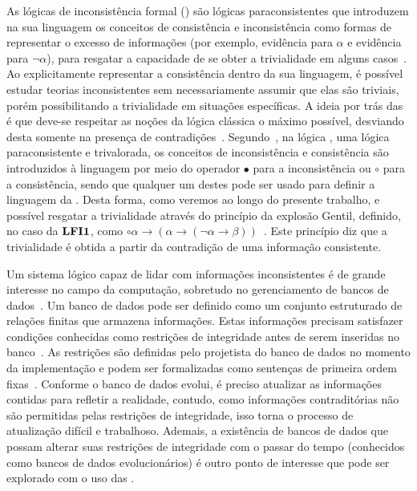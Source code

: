 As lógicas de inconsistência formal (\lfis{}) são lógicas paraconsistentes que introduzem na sua linguagem os conceitos de consistência e inconsistência como formas de representar o excesso de informações (por exemplo, evidência para $\alpha$ e evidência para $\neg \alpha$), para resgatar a capacidade de se obter a trivialidade em alguns casos~\cite{carnielli2007}. Ao explicitamente representar a consistência dentro da sua linguagem, é possível estudar teorias inconsistentes sem necessariamente assumir que elas são triviais, porém possibilitando a trivialidade em situações específicas. A ideia por trás das \lfis{} é que deve-se respeitar as noções da lógica clássica o máximo possível, desviando desta somente na presença de contradições~\cite{sep-logic-paraconsistent}. Segundo~, na lógica \lfium{}, uma lógica paraconsistente e trivalorada, os conceitos de inconsistência e consistência são introduzidos à linguagem por meio do operador $\bullet$ para a inconsistência ou $\circ$ para a consistência, sendo que qualquer um destes pode ser usado para definir a linguagem da \lfium{}. Desta forma, como veremos ao longo do presente trabalho, e possível resgatar a trivialidade através do princípio da explosão Gentil, definido, no caso da $\text{{\normalfont\textbf{LFI1}}{}}$, como $\circ \alpha \to (\alpha \to (\neg \alpha \to \beta))$~\cite{carnielli2007}. Este princípio diz que a trivialidade é obtida a partir da contradição de uma informação consistente.


Um sistema lógico capaz de lidar com informações inconsistentes é de grande interesse no campo da computação, sobretudo no gerenciamento de bancos de dados~\cite{carnielli2000formal}. Um banco de dados pode ser definido como um conjunto estruturado de relações finitas que armazena informações. Estas informações precisam satisfazer condições conhecidas como restrições de integridade antes de serem inseridas no banco~\cite{Codd}. As restrições são definidas pelo projetista do banco de dados no momento da implementação e podem ser formalizadas como sentenças de primeira ordem fixas~\cite{carnielli2000formal}. Conforme o banco de dados evolui, é preciso atualizar as informações contidas para refletir a realidade, contudo, como informações contraditórias não são permitidas pelas restrições de integridade, isso torna o processo de atualização difícil e trabalhoso. Ademais, a existência de bancos de dados que possam alterar suas restrições de integridade com o passar do tempo (conhecidos como bancos de dados evolucionários) é outro ponto de interesse que pode ser explorado com o uso das \lfis{}.

